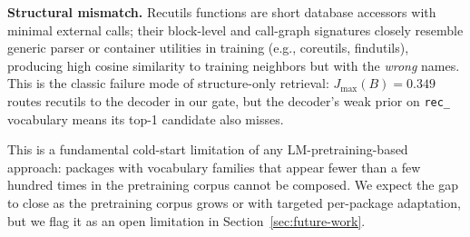 \textbf{Structural mismatch.}
Recutils functions are short database accessors with minimal external calls; their block-level and call-graph signatures closely resemble generic parser or container utilities in training (e.g., coreutils, findutils), producing high cosine similarity to training neighbors but with the \emph{wrong} names. This is the classic failure mode of structure-only retrieval: $J_{\max}(B){=}0.349$ routes recutils to the decoder in our gate, but the decoder's weak prior on \texttt{rec\_} vocabulary means its top-1 candidate also misses.

This is a fundamental cold-start limitation of any LM-pretraining-based approach: packages with vocabulary families that appear fewer than a few hundred times in the pretraining corpus cannot be composed. We expect the gap to close as the pretraining corpus grows or with targeted per-package adaptation, but we flag it as an open limitation in Section~\ref{sec:future-work}.
